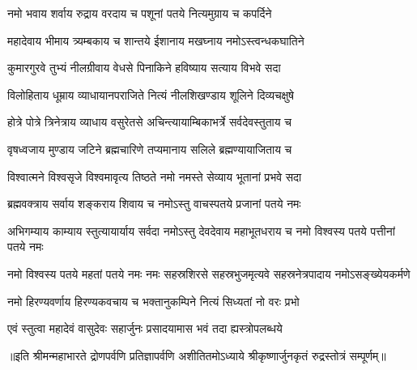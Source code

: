 


\addtocounter{shlokacount}{54}

\twolineshloka
{नमो भवाय शर्वाय रुद्राय वरदाय च}
{पशूनां पतये नित्यमुग्राय च कपर्दिने}%

\twolineshloka
{महादेवाय भीमाय त्र्यम्बकाय च शान्तये}
{ईशानाय मखघ्नाय नमोऽस्त्वन्धकघातिने}%

\twolineshloka
{कुमारगुरवे तुभ्यं नीलग्रीवाय वेधसे}
{पिनाकिने हविष्याय सत्याय विभवे सदा}%

\twolineshloka
{विलोहिताय धूम्राय व्याधायानपराजिते}
{नित्यं नीलशिखण्डाय शूलिने दिव्यचक्षुषे}%

\twolineshloka
{होत्रे पोत्रे त्रिनेत्राय व्याधाय वसुरेतसे}
{अचिन्त्यायाम्बिकाभर्त्रे सर्वदेवस्तुताय च}%

\twolineshloka
{वृषध्वजाय मुण्डाय जटिने ब्रह्मचारिणे}
{तप्यमानाय सलिले ब्रह्मण्यायाजिताय च}%

\twolineshloka
{विश्वात्मने विश्वसृजे विश्वमावृत्य तिष्ठते}
{नमो नमस्ते सेव्याय भूतानां प्रभवे सदा}%

\twolineshloka
{ब्रह्मवक्त्राय सर्वाय शङ्कराय शिवाय च}
{नमोऽस्तु वाचस्पतये प्रजानां पतये नमः}%

\threelineshloka
{अभिगम्याय काम्याय स्तुत्यायार्याय सर्वदा}
{नमोऽस्तु देवदेवाय महाभूतधराय च}
{नमो विश्वस्य पतये पत्तीनां पतये नमः}%

\threelineshloka
{नमो विश्वस्य पतये महतां पतये नमः}
{नमः सहस्रशिरसे सहस्रभुजमृत्यवे}
{सहस्रनेत्रपादाय नमोऽसङ्ख्येयकर्मणे}%

\twolineshloka
{नमो हिरण्यवर्णाय हिरण्यकवचाय च}
{भक्तानुकम्पिने नित्यं सिध्यतां नो वरः प्रभो}%


\twolineshloka
{एवं स्तुत्वा महादेवं वासुदेवः सहार्जुनः}
{प्रसादयामास भवं तदा ह्यस्त्रोपलब्धये}%

॥इति श्रीमन्महाभारते द्रोणपर्वणि प्रतिज्ञापर्वणि अशीतितमोऽध्याये श्रीकृष्णार्जुनकृतं रुद्रस्तोत्रं सम्पूर्णम्॥